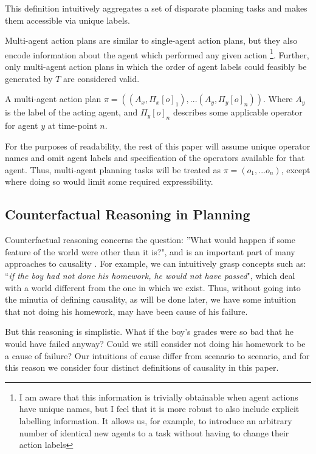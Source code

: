 \documentclass{article}
\theoremstyle{plain}
\theoremstyle{definition}
\begin{document}
This definition intuitively aggregates a set of disparate planning tasks and makes them accessible via unique labels.

Multi-agent action plans are similar to single-agent action plans, but they also encode information about the agent which performed any given action \footnote{I am aware that this information is trivially obtainable when agent actions have unique names, but I feel that it is more robust to also include explicit labelling information. It allows us, for example, to introduce an arbitrary number of identical new agents to a task without having to change their action labels}. Further, only multi-agent action plans in which the order of agent labels could feasibly be generated by $T$ are considered valid.

A multi-agent action plan $\pi=((A_x, \Pi_x[o]_1),...(A_y, \Pi_y[o]_n))$. Where $A_y$ is the label of the acting agent, and $\Pi_y[o]_n$ describes some applicable operator for agent $y$ at time-point $n$.

For the purposes of readability, the rest of this paper will assume unique operator names and omit agent labels and specification of the operators available for that agent. Thus, multi-agent planning tasks will be treated as $\pi=(o_1,...o_n)$, except where doing so would limit some required expressibility. 

\subsection{Counterfactual Reasoning in Planning}

Counterfactual reasoning concerns the question: ''What would happen if some feature of the world were other than it is?", and is an important part of many approaches to causality \cite{halpern2005causes}. For example, we can intuitively grasp concepts such as: ``\textit{if the boy had not done his homework, he would not have passed}", which deal with a world different from the one in which we exist. Thus, without going into the minutia of defining causality, as will be done later, we have some intuition that not doing his homework, may have been cause of his failure.

But this reasoning is simplistic. What if the boy's grades were so bad that he would have failed anyway? Could we still consider not doing his homework to be a cause of failure? Our intuitions of cause differ from scenario to scenario, and for this reason we consider four distinct definitions of causality in this paper.
\end{document}
